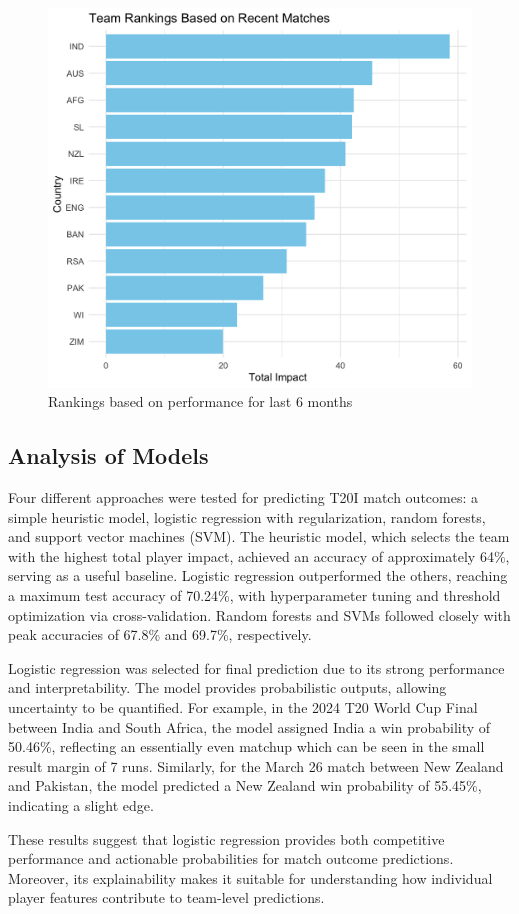 \documentclass{article}[12pt]
\begin{document}
\begin{figure}[!ht]
    \centering
    \includegraphics[width=0.5\linewidth]{team_rankings.png}
    \caption{Rankings based on performance for last 6 months}
    \label{fig:rankings}
\end{figure}


\subsection{Analysis of Models}

Four different approaches were tested for predicting T20I match outcomes: a simple heuristic model, logistic regression with regularization, random forests, and support vector machines (SVM). The heuristic model, which selects the team with the highest total player impact, achieved an accuracy of approximately 64\%, serving as a useful baseline. Logistic regression outperformed the others, reaching a maximum test accuracy of 70.24\%, with hyperparameter tuning and threshold optimization via cross-validation. Random forests and SVMs followed closely with peak accuracies of 67.8\% and 69.7\%, respectively.

Logistic regression was selected for final prediction due to its strong performance and interpretability. The model provides probabilistic outputs, allowing uncertainty to be quantified. For example, in the 2024 T20 World Cup Final between India and South Africa, the model assigned India a win probability of 50.46\%, reflecting an essentially even matchup which can be seen in the small result margin of 7 runs. Similarly, for the March 26 match between New Zealand and Pakistan, the model predicted a New Zealand win probability of 55.45\%, indicating a slight edge. 

These results suggest that logistic regression provides both competitive performance and actionable probabilities for match outcome predictions. Moreover, its explainability makes it suitable for understanding how individual player features contribute to team-level predictions.
\end{document}
